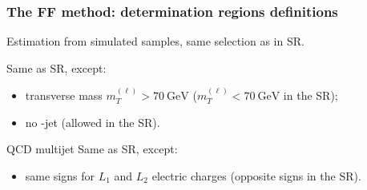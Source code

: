 %

\begin{frame}
\frametitle{The FF method: determination regions definitions}

\begin{block}{\ttbar}
Estimation from simulated samples, same selection as in SR.
\end{block}

\pause\vfill

\begin{block}{\Wjets}
Same as SR, except:
\begin{itemize}
\item transverse mass $m_T^{(\ell)}>\SI{70}{\GeV}$ ($m_T^{(\ell)}<\SI{70}{\GeV}$ in the SR);
\item no \quarkb-jet (allowed in the SR).
\end{itemize}
\end{block}

\pause\vfill

\begin{block}{QCD multijet}
Same as SR, except:
\begin{itemize}
\item same signs for $L_1$ and $L_2$ electric charges (opposite signs in the SR).
\end{itemize}
\end{block}

\vfill
\end{frame}

